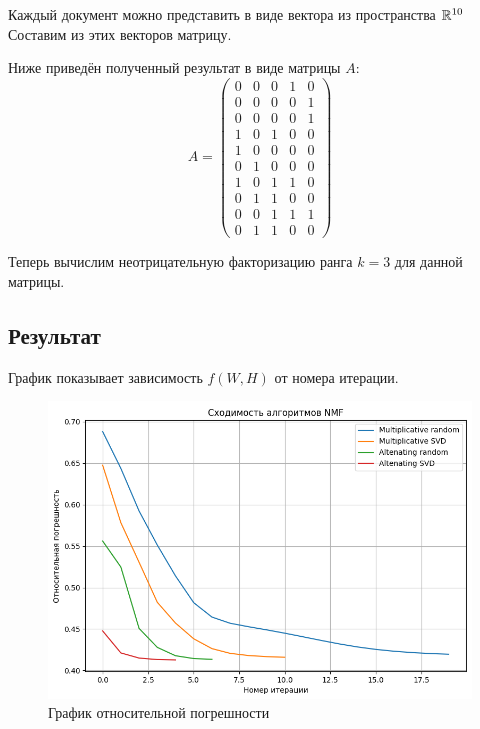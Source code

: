 Каждый документ можно представить в виде вектора из пространства $\mathbb{R}^{10}$
Составим из этих векторов матрицу.

\newpage

Ниже приведён полученный результат в виде матрицы $A$:
\begin{equation*}
A =
\begin{pmatrix}
0 & 0 & 0 & 1 & 0 \\
0 & 0 & 0 & 0 & 1 \\
0 & 0 & 0 & 0 & 1 \\
1 & 0 & 1 & 0 & 0 \\
1 & 0 & 0 & 0 & 0 \\
0 & 1 & 0 & 0 & 0 \\
1 & 0 & 1 & 1 & 0 \\
0 & 1 & 1 & 0 & 0 \\
0 & 0 & 1 & 1 & 1 \\
0 & 1 & 1 & 0 & 0
\end{pmatrix}
\end{equation*}

Теперь вычислим неотрицательную факторизацию ранга $k=3$ для данной матрицы.


\subsection{Результат}

График показывает зависимость $f(W, H)$ от номера итерации.

\begin{figure}[h]
  \includegraphics[width=\linewidth]{assets/Graph1.png}
  \caption{График относительной погрешности}
  \label{fig:relativeApproximationError}
\end{figure}

